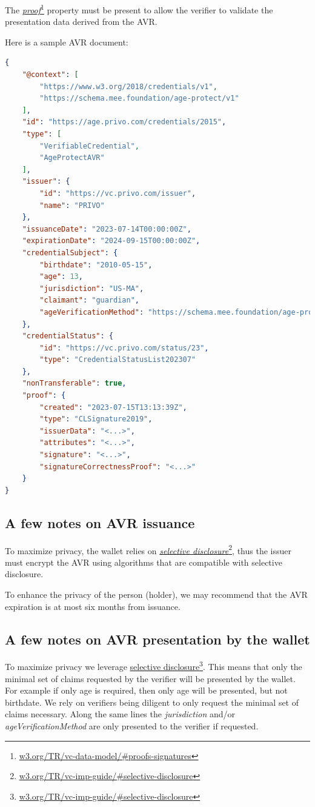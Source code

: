 \documentclass[11pt, oneside]{article}   	%
\newcommand{\hyperfootnote}[1][]{\def\ArgI{{#1}}\hyperfootnoteRelay}
\newcommand\hyperfootnoteRelay[2][]{\href{#1#2}{\ArgI}\footnote{\href{#1#2}{#2}}}
\begin{document}
The \hyperfootnote[\emph{proof}][https://]{w3.org/TR/vc-data-model/\#proofs-signatures} property must be present to allow the verifier to validate the presentation data derived from the AVR.

Here is a sample AVR document:

\begin{lstlisting}[language=json,firstnumber=1]
{
	"@context": [
		"https://www.w3.org/2018/credentials/v1",
		"https://schema.mee.foundation/age-protect/v1"
	],
	"id": "https://age.privo.com/credentials/2015",
	"type": [
		"VerifiableCredential",
		"AgeProtectAVR"
	],
	"issuer": {
		"id": "https://vc.privo.com/issuer",
		"name": "PRIVO"
	},
	"issuanceDate": "2023-07-14T00:00:00Z",
	"expirationDate": "2024-09-15T00:00:00Z",
	"credentialSubject": {
		"birthdate": "2010-05-15",
		"age": 13,
		"jurisdiction": "US-MA",
		"claimant": "guardian",
		"ageVerificationMethod": "https://schema.mee.foundation/age-protect/v1#AgeEstimation"
	},
	"credentialStatus": {
		"id": "https://vc.privo.com/status/23",
		"type": "CredentialStatusList202307"
	},
	"nonTransferable": true,
	"proof": {
		"created": "2023-07-15T13:13:39Z",
		"type": "CLSignature2019",
		"issuerData": "<...>",
		"attributes": "<...>",
		"signature": "<...>",
		"signatureCorrectnessProof": "<...>"
	}
}
\end{lstlisting}

\subsection{A few notes on AVR issuance}

To maximize privacy, the wallet relies on \hyperfootnote[\emph{selective disclosure}][https://]{w3.org/TR/vc-imp-guide/\#selective-disclosure}, thus the issuer must encrypt the AVR using algorithms that are compatible with selective disclosure.

To enhance the privacy of the person (holder), we may recommend that the AVR expiration is at most six months from issuance. 

\subsection{A few notes on AVR presentation by the wallet}

To maximize privacy we leverage \hyperfootnote[selective disclosure][https://]{w3.org/TR/vc-imp-guide/\#selective-disclosure}. This means that only the minimal set of claims requested by the verifier will be presented by the wallet. For example if only age is required, then only age will be presented, but not birthdate. We rely on verifiers being diligent to only request the minimal set of claims necessary. Along the same lines the \emph{jurisdiction} and/or \emph{ageVerificationMethod} are only presented to the verifier if requested. 
\end{document}
